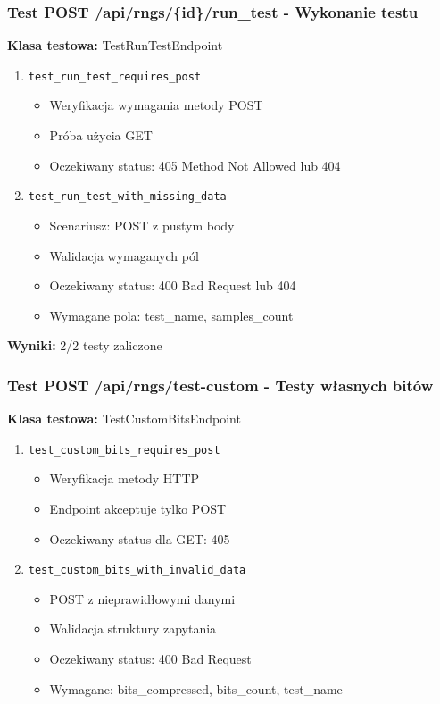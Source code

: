 \documentclass[12pt,a4paper]{article}
\begin{document}
\subsubsection{Test POST /api/rngs/\{id\}/run\_test - Wykonanie testu}

\textbf{Klasa testowa:} TestRunTestEndpoint

\begin{enumerate}
    \item \texttt{test\_run\_test\_requires\_post}
    \begin{itemize}
        \item Weryfikacja wymagania metody POST
        \item Próba użycia GET
        \item Oczekiwany status: 405 Method Not Allowed lub 404
    \end{itemize}
    
    \item \texttt{test\_run\_test\_with\_missing\_data}
    \begin{itemize}
        \item Scenariusz: POST z pustym body
        \item Walidacja wymaganych pól
        \item Oczekiwany status: 400 Bad Request lub 404
        \item Wymagane pola: test\_name, samples\_count
    \end{itemize}
\end{enumerate}

\textbf{Wyniki:} 2/2 testy zaliczone

\subsubsection{Test POST /api/rngs/test-custom - Testy własnych bitów}

\textbf{Klasa testowa:} TestCustomBitsEndpoint

\begin{enumerate}
    \item \texttt{test\_custom\_bits\_requires\_post}
    \begin{itemize}
        \item Weryfikacja metody HTTP
        \item Endpoint akceptuje tylko POST
        \item Oczekiwany status dla GET: 405
    \end{itemize}
    
    \item \texttt{test\_custom\_bits\_with\_invalid\_data}
    \begin{itemize}
        \item POST z nieprawidłowymi danymi
        \item Walidacja struktury zapytania
        \item Oczekiwany status: 400 Bad Request
        \item Wymagane: bits\_compressed, bits\_count, test\_name
    \end{itemize}
\end{enumerate}
\end{document}
